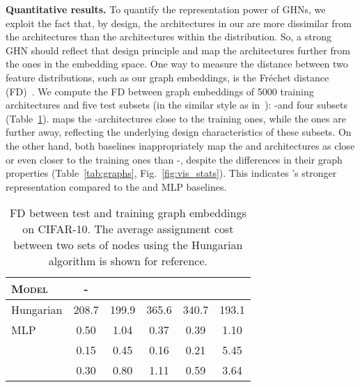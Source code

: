 \textbf{Quantitative results.} To quantify the representation power of GHNs, we exploit the fact that, by design, the \ood architectures in our \dataset are more dissimilar from the \iid architectures than the architectures within the \iid distribution. So, a strong GHN should reflect that design principle and map the \ood architectures further from the \iid ones in the embedding space. One way to measure the distance between two feature distributions, such as our graph embeddings, is the Fr\'{e}chet distance (FD)~\cite{dowson1982frechet}. We compute the FD between graph embeddings of 5000 training architectures and five test subsets (in the similar style as in~\cite{liu2019auto2,zilly2019frechet,thompson2020building}): \iid-\iidtest and four \ood subsets (Table~\ref{tab:fd}).
\ghnours maps the \iid-\iidtest architectures close to the training ones, while the \ood ones are further away, reflecting the underlying design characteristics of these subsets. 
On the other hand, both baselines inappropriately map the \deep and \dense architectures as close or even closer to the training ones than \iid-\iidtest, despite the differences in their graph properties (Table~\ref{tab:graphs}, Fig.~\ref{fig:vis_stats}). This indicates \ghnours's stronger representation compared to the \ghnbase and MLP baselines.

\begin{table}[htpb]
	\vspace{0pt}
	\centering
	\caption{FD between test and training graph embeddings on CIFAR-10. The average assignment cost between two sets of nodes using the Hungarian algorithm is shown for reference.}
	\label{tab:fd}
	\vspace{3pt}
	\small
	\setlength{\tabcolsep}{5pt}
	\begin{tabular}{p{1.2cm}ccccc}
		\toprule
		\textbf{\textsc{Model}} & \textbf{\iid-\iidtest} & \textbf{\wide} & \textbf{\deep} & \textbf{\dense} & \textbf{\bnfree} \\
		\midrule
		Hungarian & 208.7 & 199.9 & 365.6 & 340.7 & 193.1 \\
		MLP & 0.50 & 1.04 & \cellcolor{bad}0.37 & \cellcolor{bad}0.39 & 1.10\Tstrut\\
		\ghnbase & 0.15 & 0.45 & \cellcolor{bad}0.16 & \cellcolor{bad}0.21 & 5.45 \\
		\ghnours & 0.30 & 0.80 & 1.11 & 0.59 & 3.64 \\
		\bottomrule
	\end{tabular}
	\vspace{0pt}
\end{table}

